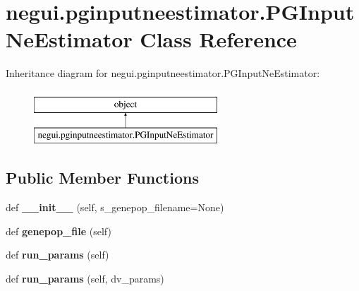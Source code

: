 \hypertarget{classnegui_1_1pginputneestimator_1_1PGInputNeEstimator}{}\section{negui.\+pginputneestimator.\+P\+G\+Input\+Ne\+Estimator Class Reference}
\label{classnegui_1_1pginputneestimator_1_1PGInputNeEstimator}
Inheritance diagram for negui.\+pginputneestimator.\+P\+G\+Input\+Ne\+Estimator\+:\begin{figure}[H]
\begin{center}
\leavevmode
\includegraphics[height=2.000000cm]{classnegui_1_1pginputneestimator_1_1PGInputNeEstimator}
\end{center}
\end{figure}
\subsection*{Public Member Functions}
\begin{DoxyCompactItemize}
\item 
def {\bfseries \+\_\+\+\_\+init\+\_\+\+\_\+} (self, s\+\_\+genepop\+\_\+filename=None)\hypertarget{classnegui_1_1pginputneestimator_1_1PGInputNeEstimator_a88f248394897343472d0edf7c2e3ea3b}{}\label{classnegui_1_1pginputneestimator_1_1PGInputNeEstimator_a88f248394897343472d0edf7c2e3ea3b}

\item 
def {\bfseries genepop\+\_\+file} (self)\hypertarget{classnegui_1_1pginputneestimator_1_1PGInputNeEstimator_a3f32de00a24cc7a7dd28921697a58d4b}{}\label{classnegui_1_1pginputneestimator_1_1PGInputNeEstimator_a3f32de00a24cc7a7dd28921697a58d4b}

\item 
def {\bfseries run\+\_\+params} (self)\hypertarget{classnegui_1_1pginputneestimator_1_1PGInputNeEstimator_a87b6c321f810ee6efeee451958b92e56}{}\label{classnegui_1_1pginputneestimator_1_1PGInputNeEstimator_a87b6c321f810ee6efeee451958b92e56}

\item 
def {\bfseries run\+\_\+params} (self, dv\+\_\+params)\hypertarget{classnegui_1_1pginputneestimator_1_1PGInputNeEstimator_a1312da644290832102fb8937c38167bc}{}\label{classnegui_1_1pginputneestimator_1_1PGInputNeEstimator_a1312da644290832102fb8937c38167bc}

\end{DoxyCompactItemize}


